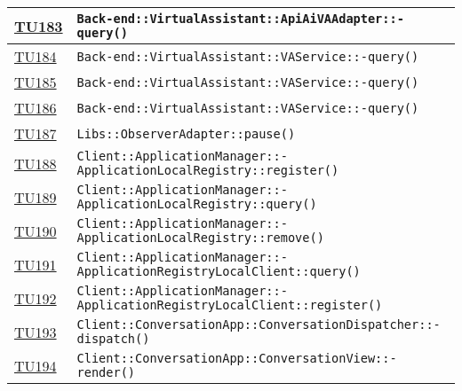 \begin{longtable}{|>{\centering}m{1cm}|m{12cm}<{\centering}|}
\hyperlink{TU183}{TU183} & \texttt{Back-end::VirtualAssistant::ApiAiVAAdapter::-\linebreak query()}\\ \hline

\hyperlink{TU184}{TU184} & \texttt{Back-end::VirtualAssistant::VAService::-\linebreak query()}\\ \hline

\hyperlink{TU185}{TU185} & \texttt{Back-end::VirtualAssistant::VAService::-\linebreak query()}\\ \hline

\hyperlink{TU186}{TU186} & \texttt{Back-end::VirtualAssistant::VAService::-\linebreak query()}\\ \hline

\hyperlink{TU187}{TU187} & \texttt{Libs::ObserverAdapter::pause()}\\ \hline

\hyperlink{TU188}{TU188} & \texttt{Client::ApplicationManager::-\linebreak ApplicationLocalRegistry::register()}\\ \hline

\hyperlink{TU189}{TU189} & \texttt{Client::ApplicationManager::-\linebreak ApplicationLocalRegistry::query()}\\ \hline

\hyperlink{TU190}{TU190} & \texttt{Client::ApplicationManager::-\linebreak ApplicationLocalRegistry::remove()}\\ \hline

\hyperlink{TU191}{TU191} & \texttt{Client::ApplicationManager::-\linebreak ApplicationRegistryLocalClient::query()}\\ \hline

\hyperlink{TU192}{TU192} & \texttt{Client::ApplicationManager::-\linebreak ApplicationRegistryLocalClient::register()}\\ \hline

\hyperlink{TU193}{TU193} & \texttt{Client::ConversationApp::ConversationDispatcher::-\linebreak dispatch()}\\ \hline

\hyperlink{TU194}{TU194} & \texttt{Client::ConversationApp::ConversationView::-\linebreak render()}\\ \hline


\end{longtable}
